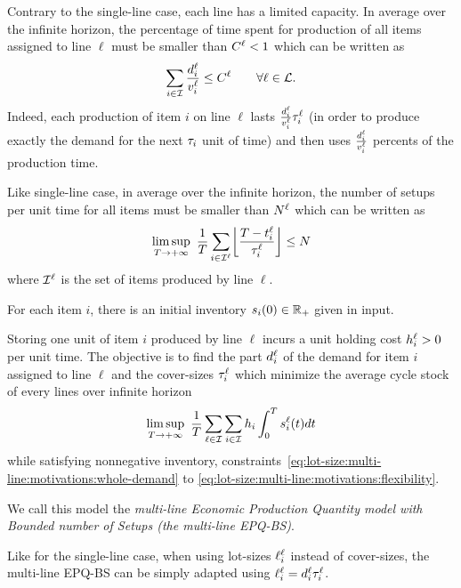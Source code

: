 Contrary to the single-line case, each line has a limited capacity.
In average over the infinite horizon, the percentage of time spent for production of all items assigned to line $\ell$ must be smaller than $C^{\ell}<1$ which can be written as
\begin{equation}\label{eq:lot-size:multi-line:motivations:capacity}
  \sum_{i\in\mathcal{I}}\frac{d_i^{\ell}}{v_i^{\ell}}\le C^{\ell}\qquad\forall \ell\in\mathcal{L}.
\end{equation}
Indeed, each production of item $i$ on line $\ell$ lasts $\frac{d_i^{\ell}}{v_i^{\ell}}\tau_i^{\ell}$ (in order to produce exactly the demand for the next $\tau_i$ unit of time) and then uses $\frac{d_i^{\ell}}{v_i^{\ell}}$ percents of the production time.


Like single-line case, in average over the infinite horizon, the number of setups per unit time for all items must be smaller than $N^{\ell}$ which can be written as
\begin{equation}\label{eq:lot-size:multi-line:motivations:flexibility}
  \limsup_{\horizon\rightarrow+\infty}\ \frac{1}{\horizon} \sum_{i\in\REF^{\ell}} \left\lfloor\frac{\horizon-t_i^{\ell}}{\cover_i^{\ell}}\right\rfloor \le \nbsetups
\end{equation}
where $\mathcal{I}^{\ell}$ is the set of items produced by line $\ell$.


For each item $i$, there is an initial inventory $\inventory_i\bracket{0}\in\RR_+$ given in input.


Storing one unit of item $i$ produced by line $\ell$ incurs a unit holding cost $h_i^{\ell}>0$ per unit time.
The objective is to find the part $d_i^{\ell}$ of the demand for item $i$ assigned to line $\ell$ and the cover-sizes $\tau_i^{\ell}$ which minimize the average cycle stock of every lines over infinite horizon
\begin{equation}
  \limsup_{\horizon\rightarrow+\infty}\ \frac{1}{\horizon} \sum_{\ell\in\REF} \sum_{i\in\REF} \holding_i \int_0^{\horizon}\inventory_i^{\ell}\bracket{t}dt
\end{equation}
while satisfying nonnegative inventory, constraints~\eqref{eq:lot-size:multi-line:motivations:whole-demand} to \eqref{eq:lot-size:multi-line:motivations:flexibility}.


We call this model the \emph{multi-line Economic Production Quantity model with Bounded number of Setups (the multi-line EPQ-BS)}.

Like for the single-line case, when using lot-sizes $\ell_i^{\ell}$ instead of cover-sizes, the multi-line EPQ-BS can be simply adapted using $\ell_i^{\ell}=d_i^{\ell}\tau_i^{\ell}$.



